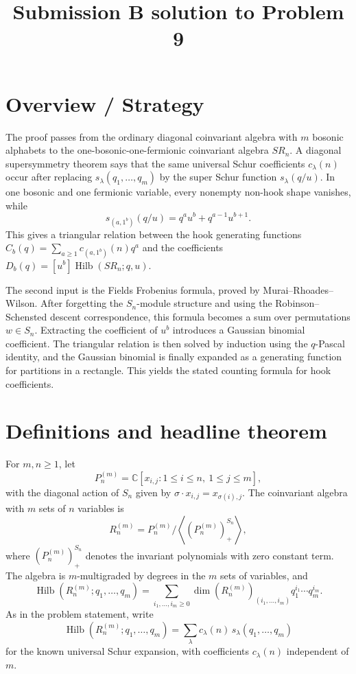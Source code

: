 \documentclass[12pt]{article}
\DeclareMathOperator{\Hilb}{Hilb}
\begin{document}
\title{Submission B solution to Problem 9}
\date{}
\maketitle

\section*{Overview / Strategy}

The proof passes from the ordinary diagonal coinvariant algebra with \(m\) bosonic alphabets to the one-bosonic-one-fermionic coinvariant algebra \(SR_n\).  A diagonal supersymmetry theorem says that the same universal Schur coefficients \(c_\lambda(n)\) occur after replacing \(s_\lambda(q_1,\ldots,q_m)\) by the super Schur function \(s_\lambda(q/u)\).  In one bosonic and one fermionic variable, every nonempty non-hook shape vanishes, while
\[
s_{(a,1^b)}(q/u)=q^a u^b+q^{a-1}u^{b+1}.
\]
This gives a triangular relation between the hook generating functions \(C_b(q)=\sum_{a\ge 1}c_{(a,1^b)}(n)q^a\) and the coefficients \(D_b(q)=[u^b]\Hilb(SR_n;q,u)\).

The second input is the Fields Frobenius formula, proved by Murai--Rhoades--Wilson.  After forgetting the \(S_n\)-module structure and using the Robinson--Schensted descent correspondence, this formula becomes a sum over permutations \(w\in S_n\).  Extracting the coefficient of \(u^b\) introduces a Gaussian binomial coefficient.  The triangular relation is then solved by induction using the \(q\)-Pascal identity, and the Gaussian binomial is finally expanded as a generating function for partitions in a rectangle.  This yields the stated counting formula for hook coefficients.

\section{Definitions and headline theorem}

For \(m,n\ge 1\), let
\[
P_n^{(m)}=\mathbb C[x_{i,j}:1\le i\le n,\ 1\le j\le m],
\]
with the diagonal action of \(S_n\) given by \(\sigma\cdot x_{i,j}=x_{\sigma(i),j}\).  The coinvariant algebra with \(m\) sets of \(n\) variables is
\[
R_n^{(m)}
=
P_n^{(m)}\big/
\left\langle \left(P_n^{(m)}\right)^{S_n}_{+}\right\rangle,
\]
where \(\left(P_n^{(m)}\right)^{S_n}_{+}\) denotes the invariant polynomials with zero constant term.  The algebra is \(m\)-multigraded by degrees in the \(m\) sets of variables, and
\[
\Hilb(R_n^{(m)};q_1,\ldots,q_m)
=
\sum_{i_1,\ldots,i_m\ge 0}
\dim\!\left(R_n^{(m)}\right)_{(i_1,\ldots,i_m)}
q_1^{i_1}\cdots q_m^{i_m}.
\]
As in the problem statement, write
\[
\Hilb(R_n^{(m)};q_1,\ldots,q_m)
=
\sum_{\lambda} c_\lambda(n)\,s_\lambda(q_1,\ldots,q_m)
\]
for the known universal Schur expansion, with coefficients \(c_\lambda(n)\) independent of \(m\).
\end{document}
